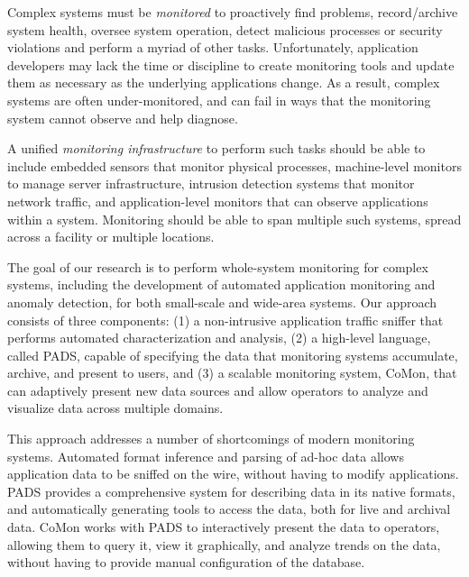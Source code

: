 

Complex systems must be {\em monitored} to proactively find problems,
record/archive system health, oversee system operation, detect
malicious processes or security violations and perform a myriad of
other tasks.  Unfortunately, application developers may lack the time
or discipline to create monitoring tools and update them as necessary
as the underlying applications change. As a result, complex systems
are often under-monitored, and can fail in ways that the monitoring
system cannot observe and help diagnose.

A unified {\em monitoring infrastructure} to perform such tasks should
be able to include embedded sensors that monitor physical processes,
machine-level monitors to manage server infrastructure, intrusion
detection systems that monitor network traffic, and application-level
monitors that can observe applications within a system. Monitoring
should be able to span multiple such systems, spread across a facility
or multiple locations.

The goal of our research is to perform whole-system monitoring for
complex systems, including the development of automated application
monitoring and anomaly detection, for both small-scale and wide-area
systems. Our approach consists of three components: (1) a
non-intrusive application traffic sniffer that performs automated
characterization and analysis, (2) a high-level language, called PADS,
capable of specifying the data that monitoring systems accumulate,
archive, and present to users, and (3) a scalable monitoring system,
CoMon, that can adaptively present new data sources and allow
operators to analyze and visualize data across multiple domains.

This approach addresses a number of shortcomings of modern monitoring
systems. Automated format inference and parsing of ad-hoc data allows
application data to be sniffed on the wire, without having to modify
applications. PADS provides a comprehensive system for describing data
in its native formats, and automatically generating tools to access
the data, both for live and archival data. CoMon works with PADS to
interactively present the data to operators, allowing them to query
it, view it graphically, and analyze trends on the data, without having
to provide manual configuration of the database.


